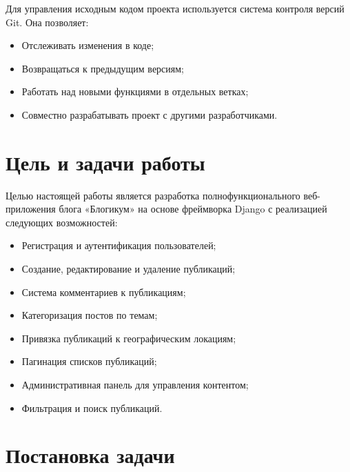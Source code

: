 \documentclass[pract,och,bachelor]{SCWorks}
\begin{document}
Для управления исходным кодом проекта используется система контроля версий Git. Она позволяет:
\begin{itemize}
    \item Отслеживать изменения в коде;
    \item Возвращаться к предыдущим версиям;
    \item Работать над новыми функциями в отдельных ветках;
    \item Совместно разрабатывать проект с другими разработчиками.
\end{itemize}

\section{Цель и задачи работы}

Целью настоящей работы является разработка полнофункционального веб-приложения блога «Блогикум» на основе фреймворка Django с реализацией следующих возможностей:

\begin{itemize}
    \item Регистрация и аутентификация пользователей;
    \item Создание, редактирование и удаление публикаций;
    \item Система комментариев к публикациям;
    \item Категоризация постов по темам;
    \item Привязка публикаций к географическим локациям;
    \item Пагинация списков публикаций;
    \item Административная панель для управления контентом;
    \item Фильтрация и поиск публикаций.
\end{itemize}

\section{Постановка задачи}
\end{document}
